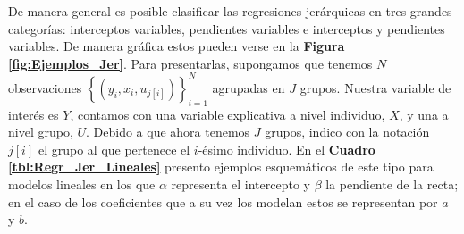 De manera general es posible clasificar las regresiones jerárquicas en tres grandes categorías: interceptos variables, pendientes variables e interceptos y pendientes variables. De manera gráfica estos pueden verse en la \textbf{Figura \ref{fig:Ejemplos_Jer}}. Para presentarlas, supongamos que tenemos $N$ observaciones $\left\lbrace(y_i,x_i,u_{j[i]})\right\rbrace_{i=1}^{N}$ agrupadas en $J$ grupos. Nuestra variable de interés es $Y$, contamos con una variable explicativa a nivel individuo, $X$,  y una a nivel grupo,  $U$.  Debido a que ahora tenemos $J$ grupos, indico con la notación $j[i]$ el grupo al que pertenece el $i$-ésimo individuo. En el \textbf{Cuadro \ref{tbl:Regr_Jer_Lineales}} presento ejemplos esquemáticos de este tipo para modelos lineales en los que $\alpha$ representa el intercepto y $\beta$ la pendiente de la recta; en el caso de los coeficientes que a su vez los modelan estos se representan por $a$ y $b$.\\

